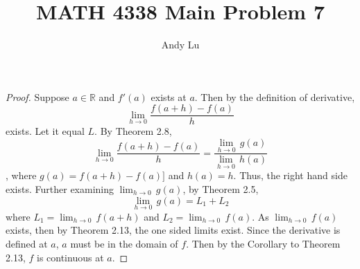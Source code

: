 \documentclass{article}
\title{MATH 4338 Main Problem 7}
\date{}
\author{Andy Lu}
\begin{document}
  \maketitle
  \begin{proof}
    Suppose $a \in \mathbb{R}$ and $f'(a)$ exists at $a$. Then by the definition
    of derivative, $$\lim_{h \rightarrow 0} \frac{f(a+h) - f(a)}{h}$$ exists. Let 
    it equal $L$. By Theorem 2.8,
    $$\lim_{h \rightarrow 0} \frac{f(a+h) - f(a)}{h}  = 
      \frac{\lim_{h \rightarrow 0} \, g(a)}{\lim_{h \rightarrow 0} \, h(a)}$$,
    where $g(a) = f(a+h) - f(a)]$ and $h(a) = h$. Thus, the right hand side 
    exists. Further examining $\lim_{h \rightarrow 0} \, g(a)$, by Theorem 2.5,
    $$\lim_{h \rightarrow 0} \, g(a) = L_1 + L_2$$
    where $L_1 = \lim_{h \rightarrow 0} \, f(a+h)$ and 
    $L_2 = \lim_{h \rightarrow 0} \, f(a)$. 
    As $\lim_{h \rightarrow 0} \, f(a)$ exists, then by Theorem 2.13, the one
    sided limits exist. Since the derivative is defined at $a$, $a$ must be in
    the domain of $f$. Then by the Corollary to Theorem 2.13, $f$ is continuous
    at $a$.
  \end{proof}
\end{document}
